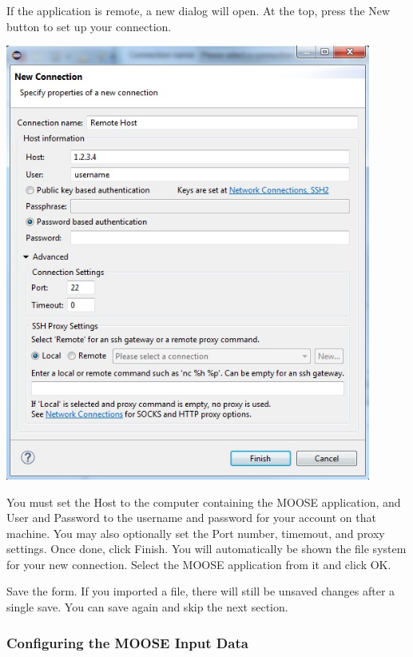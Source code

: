 If the application is remote, a new dialog will open. At the top, press the New
button to set up your connection. 

\begin{center}
\includegraphics[width=12cm]{images/NewConnectionDialog}
\end{center}

You must set the Host to the computer containing the MOOSE application, and User
and Password to the username and password for your account on that machine. You
may also optionally set the Port number, timemout, and proxy settings. Once
done, click Finish. You will automatically be shown the file system for your new
connection. Select the MOOSE application from it and click OK.

Save the form. If you imported a file, there will still be unsaved changes after
a single save. You can save again and skip the next section. 

\subsubsection{Configuring the MOOSE Input Data}


